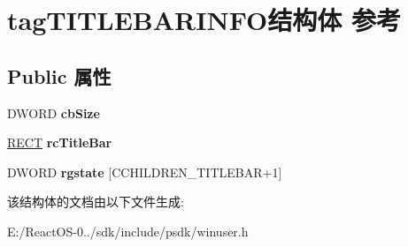 \hypertarget{structtag_t_i_t_l_e_b_a_r_i_n_f_o}{}\section{tag\+T\+I\+T\+L\+E\+B\+A\+R\+I\+N\+F\+O结构体 参考}
\label{structtag_t_i_t_l_e_b_a_r_i_n_f_o}
\subsection*{Public 属性}
\begin{DoxyCompactItemize}
\item 
\mbox{\label{structtag_t_i_t_l_e_b_a_r_i_n_f_o_adf047241f7498d96eccebcc8213ad691}} 
D\+W\+O\+RD {\bfseries cb\+Size}
\item 
\mbox{\label{structtag_t_i_t_l_e_b_a_r_i_n_f_o_a4f7653a6285ab6c3c02f396fa5cfb566}} 
\hyperlink{structtag_r_e_c_t}{R\+E\+CT} {\bfseries rc\+Title\+Bar}
\item 
\mbox{\label{structtag_t_i_t_l_e_b_a_r_i_n_f_o_ad9d73d5dbfbdbfe0cdac850b344005c4}} 
D\+W\+O\+RD {\bfseries rgstate} \mbox{[}C\+C\+H\+I\+L\+D\+R\+E\+N\+\_\+\+T\+I\+T\+L\+E\+B\+AR+1\mbox{]}
\end{DoxyCompactItemize}


该结构体的文档由以下文件生成\+:\begin{DoxyCompactItemize}
\item 
E\+:/\+React\+O\+S-\/0../sdk/include/psdk/winuser.\+h\end{DoxyCompactItemize}
